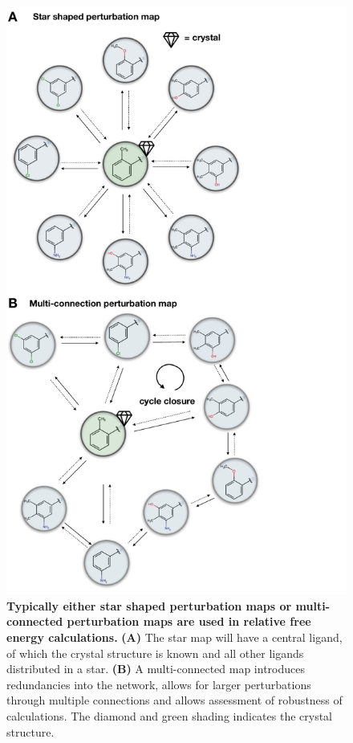 \documentclass[9pt,bestpractices]{livecoms}
\begin{document}
\begin{figure}[!ht]
    \centering
    \includegraphics[trim=0 0 200 0, clip, width=0.9\linewidth]{figures/network.pdf}
    \caption{\textbf{Typically either star shaped perturbation maps or multi-connected perturbation maps are used in relative free energy calculations.} \textbf{(A)} The star map will have a central ligand, of which the crystal structure is known and all other ligands distributed in a star. \textbf{(B)} A multi-connected map introduces redundancies into the network, allows for larger perturbations through multiple connections and allows assessment of robustness of calculations. The diamond and green shading indicates the crystal structure.}
    \label{fig:map}
\end{figure}
\end{document}
